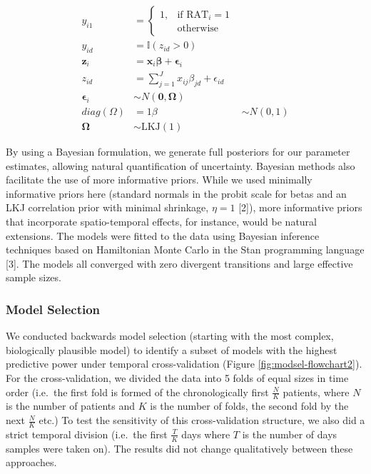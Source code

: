 \documentclass[]{elsarticle} %
\begin{document}
\begin{equation}\begin{aligned}
y_{i1} &= \begin{cases}
    1,& \text{if } \text{RAT}_i=1 \\
       & \text{otherwise}
\end{cases}\\
y_{id} &= \mathbb{I}(z_{id} > 0) \\
\boldsymbol{z}_{i} &= \boldsymbol{x}_i \boldsymbol{\beta} + \boldsymbol{\epsilon}_{i} \\
z_{id} &= \sum_{j=1}^J x_{ij}\beta_{jd} + \epsilon_{id} \\
\boldsymbol{\epsilon}_i &\sim N(\boldsymbol{0}, \boldsymbol{\Omega}) \\
diag(\Omega)&=1
{\beta} &\sim N(0,1) \\
\boldsymbol{\Omega} &\sim \text{LKJ}(1)
\label{eq:ModelClass3}
\end{aligned}\end{equation}\ignorespacesafterend


By using a Bayesian formulation, we generate full posteriors for our parameter estimates, allowing natural quantification of uncertainty.
Bayesian methods also facilitate the use of more informative priors.
While we used minimally informative priors here (standard normals in the probit scale for betas and an LKJ correlation prior with minimal shrinkage, \(\eta=1\) {[}2{]}), more informative priors that incorporate spatio-temporal effects, for instance, would be natural extensions.
The models were fitted to the data using Bayesian inference techniques based on Hamiltonian Monte Carlo in the Stan programming language {[}3{]}.
The models all converged with zero divergent transitions and large effective sample sizes.

\hypertarget{model-selection}{%
\subsubsection{Model Selection}\label{model-selection}}

We conducted backwards model selection (starting with the most complex, biologically plausible model) to identify a subset of models with the highest predictive power under temporal cross-validation (Figure \ref{fig:modsel-flowchart2}).
For the cross-validation, we divided the data into 5 folds of equal sizes in time order (i.e.~the first fold is formed of the chronologically first \(\frac{N}{K}\) patients, where \(N\) is the number of patients and \(K\) is the number of folds, the second fold by the next \(\frac{N}{K}\) etc.)
To test the sensitivity of this cross-validation structure, we also did a strict temporal division (i.e.~the first \(\frac{T}{K}\) days where \(T\) is the number of days samples were taken on).
The results did not change qualitatively between these approaches.
\end{document}
